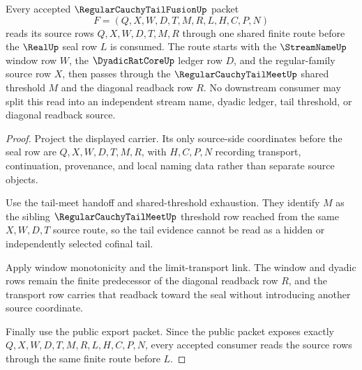 \begin{theorem}
\label{thm:regular-cauchy-tail-fusion-shared-source-readback}
Every accepted $\RegularCauchyTailFusionUp$ packet
$$
F=(Q,X,W,D,T,M,R,L,H,C,P,N)
$$
reads its source rows $Q,X,W,D,T,M,R$ through one shared finite route before the $\RealUp$ seal row $L$ is consumed. The route starts with the $\StreamNameUp$ window row $W$, the $\DyadicRatCoreUp$ ledger row $D$, and the regular-family source row $X$, then passes through the $\RegularCauchyTailMeetUp$ shared threshold $M$ and the diagonal readback row $R$. No downstream consumer may split this read into an independent stream name, dyadic ledger, tail threshold, or diagonal readback source.
\end{theorem}
\begin{proof}
Project the displayed carrier. Its only source-side coordinates before the seal row are $Q,X,W,D,T,M,R$, with $H,C,P,N$ recording transport, continuation, provenance, and local naming data rather than separate source objects.

Use the tail-meet handoff and shared-threshold exhaustion. They identify $M$ as the sibling $\RegularCauchyTailMeetUp$ threshold row reached from the same $X,W,D,T$ source route, so the tail evidence cannot be read as a hidden or independently selected cofinal tail.

Apply window monotonicity and the limit-transport link. The window and dyadic rows remain the finite predecessor of the diagonal readback row $R$, and the transport row carries that readback toward the seal without introducing another source coordinate.

Finally use the public export packet. Since the public packet exposes exactly $Q,X,W,D,T,M,R,L,H,C,P,N$, every accepted consumer reads the source rows through the same finite route before $L$.
\end{proof}

